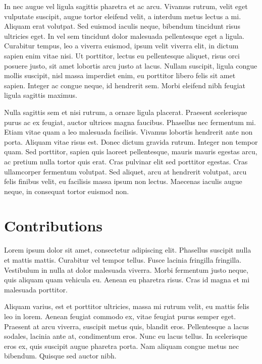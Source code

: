In nec augue vel ligula sagittis pharetra et ac arcu. Vivamus rutrum, velit eget vulputate suscipit, augue tortor eleifend velit, a interdum metus lectus a mi. 
Aliquam erat volutpat. Sed euismod iaculis neque, bibendum tincidunt risus ultricies eget. 
In vel sem tincidunt dolor malesuada pellentesque eget a ligula. Curabitur tempus, leo a viverra euismod, ipsum velit viverra elit, in dictum sapien enim vitae nisi. Ut porttitor, lectus eu pellentesque aliquet, risus orci posuere justo, sit amet lobortis arcu justo at lacus. 
Nullam suscipit, ligula congue mollis suscipit, nisl massa imperdiet enim, eu porttitor libero felis sit amet sapien. 
Integer ac congue neque, id hendrerit sem. Morbi eleifend nibh feugiat ligula sagittis maximus.

Nulla sagittis sem et nisi rutrum, a ornare ligula placerat. Praesent scelerisque purus ac ex feugiat, auctor ultrices magna faucibus. 
Phasellus nec fermentum mi. Etiam vitae quam a leo malesuada facilisis. Vivamus lobortis hendrerit ante non porta. 
Aliquam vitae risus est. Donec dictum gravida rutrum. Integer non tempor quam. 
Sed porttitor, sapien quis laoreet pellentesque, mauris mauris egestas arcu, ac pretium nulla tortor quis erat. 
Cras pulvinar elit sed porttitor egestas. Cras ullamcorper fermentum volutpat. 
Sed aliquet, arcu at hendrerit volutpat, arcu felis finibus velit, eu facilisis massa ipsum non lectus. 
Maecenas iaculis augue neque, in consequat tortor euismod non. 

\section{Contributions}

Lorem ipsum dolor sit amet, consectetur adipiscing elit. Phasellus suscipit nulla et mattis mattis. Curabitur vel tempor tellus. 
Fusce lacinia fringilla fringilla. Vestibulum in nulla at dolor malesuada viverra. Morbi fermentum justo neque, quis aliquam quam vehicula eu. 
Aenean eu pharetra risus. Cras id magna et mi malesuada porttitor.

Aliquam varius, est et porttitor ultricies, massa mi rutrum velit, eu mattis felis leo in lorem. 
Aenean feugiat commodo ex, vitae feugiat purus semper eget. Praesent at arcu viverra, suscipit metus quis, blandit eros. 
Pellentesque a lacus sodales, lacinia ante at, condimentum eros. Nunc eu lacus tellus. In scelerisque eros ex, quis suscipit augue pharetra porta. 
Nam aliquam congue metus nec bibendum. Quisque sed auctor nibh.

